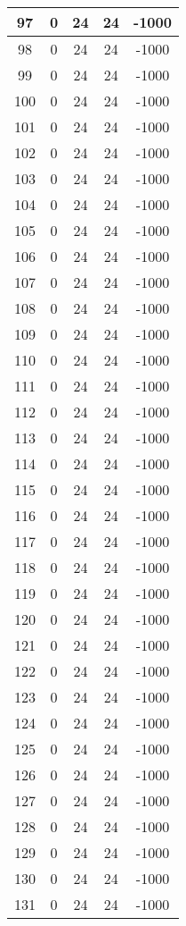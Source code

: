 \documentclass[letterpaper, 12pt]{article}
\begin{document}
\begin{longtable}{|c|c|c|c|c|}
\hline
97 & 0 & 24 & 24 & -1000 \\
\hline
98 & 0 & 24 & 24 & -1000 \\
\hline
99 & 0 & 24 & 24 & -1000 \\
\hline
100 & 0 & 24 & 24 & -1000 \\
\hline
101 & 0 & 24 & 24 & -1000 \\
\hline
102 & 0 & 24 & 24 & -1000 \\
\hline
103 & 0 & 24 & 24 & -1000 \\
\hline
104 & 0 & 24 & 24 & -1000 \\
\hline
105 & 0 & 24 & 24 & -1000 \\
\hline
106 & 0 & 24 & 24 & -1000 \\
\hline
107 & 0 & 24 & 24 & -1000 \\
\hline
108 & 0 & 24 & 24 & -1000 \\
\hline
109 & 0 & 24 & 24 & -1000 \\
\hline
110 & 0 & 24 & 24 & -1000 \\
\hline
111 & 0 & 24 & 24 & -1000 \\
\hline
112 & 0 & 24 & 24 & -1000 \\
\hline
113 & 0 & 24 & 24 & -1000 \\
\hline
114 & 0 & 24 & 24 & -1000 \\
\hline
115 & 0 & 24 & 24 & -1000 \\
\hline
116 & 0 & 24 & 24 & -1000 \\
\hline
117 & 0 & 24 & 24 & -1000 \\
\hline
118 & 0 & 24 & 24 & -1000 \\
\hline
119 & 0 & 24 & 24 & -1000 \\
\hline
120 & 0 & 24 & 24 & -1000 \\
\hline
121 & 0 & 24 & 24 & -1000 \\
\hline
122 & 0 & 24 & 24 & -1000 \\
\hline
123 & 0 & 24 & 24 & -1000 \\
\hline
124 & 0 & 24 & 24 & -1000 \\
\hline
125 & 0 & 24 & 24 & -1000 \\
\hline
126 & 0 & 24 & 24 & -1000 \\
\hline
127 & 0 & 24 & 24 & -1000 \\
\hline
128 & 0 & 24 & 24 & -1000 \\
\hline
129 & 0 & 24 & 24 & -1000 \\
\hline
130 & 0 & 24 & 24 & -1000 \\
\hline
131 & 0 & 24 & 24 & -1000 \\

\end{longtable}
\end{document}
